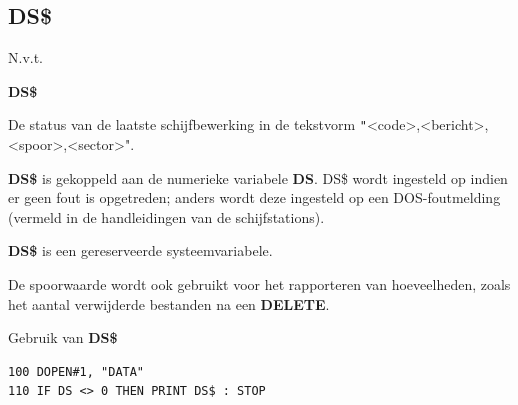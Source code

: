 
\newpage
\subsection{DS\$}
\begin{description}[leftmargin=2cm,style=nextline]
\item [Token:]    N.v.t.

\item [Formaat:]   {\bf DS\$}

\item [Gebruik:]    De status van de laatste schijfbewerking in de tekstvorm {\texttt"<code>,<bericht>,<spoor>,<sector>"}.

                  {\bf DS\$} is gekoppeld aan de numerieke variabele {\bf DS}. DS\$ wordt ingesteld op  indien er geen fout is opgetreden; anders wordt deze ingesteld op een DOS-foutmelding (vermeld in de handleidingen van de schijfstations).

\item [Opmerkingen:]  {\bf DS\$} is een gereserveerde systeemvariabele.

                  De spoorwaarde wordt ook gebruikt voor het rapporteren van hoeveelheden, zoals het aantal verwijderde bestanden na een {\bf DELETE}.

\item [Voorbeeld:]  Gebruik van {\bf DS\$}

\begin{tcolorbox}[colback=black,coltext=white]
\verbatimfont{\codefont}
\begin{verbatim}
100 DOPEN#1, "DATA"
110 IF DS <> 0 THEN PRINT DS$ : STOP
\end{verbatim}
\end{tcolorbox}
\end{description}


\newpage
